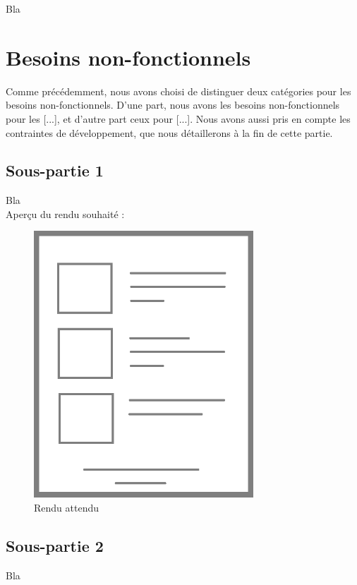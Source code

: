 Bla

\newpage

\section{Besoins non-fonctionnels}

Comme précédemment, nous avons choisi de distinguer deux catégories pour les besoins non-fonctionnels. D'une part, nous avons les besoins non-fonctionnels pour les [...], et d'autre part ceux pour [...]. Nous avons aussi pris en compte les contraintes de développement, que nous détaillerons à la fin de cette partie.

\subsection{Sous-partie 1}

Bla\\

Aperçu du rendu souhaité :

\begin{figure}[!h]
\begin{center}
\includegraphics[height=10cm]{besoins/rendu}
\end{center}
\caption{Rendu attendu}
\end{figure}

\subsection{Sous-partie 2}

Bla

